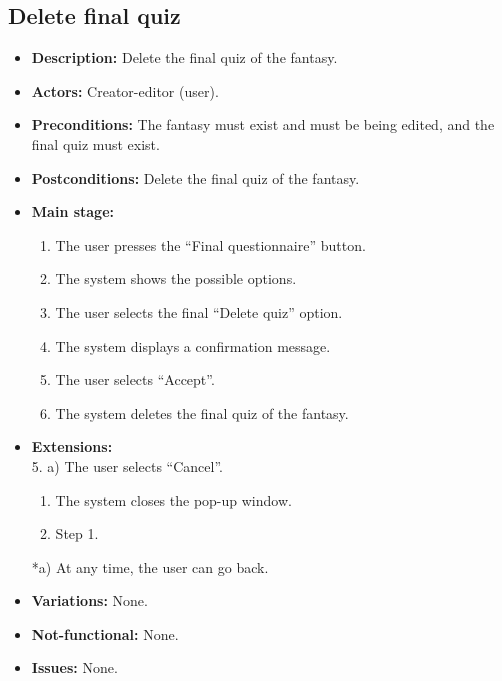 \subsection{Delete final quiz}
\begin{itemize}
	\item \textbf{Description:} Delete the final quiz of the fantasy.
	\item \textbf{Actors:} Creator-editor (user).
	\item \textbf{Preconditions:} The fantasy must exist and must be being edited, and the final quiz must exist.
	\item \textbf{Postconditions:} Delete the final quiz of the fantasy.
	\item \textbf{Main stage:}
	\begin{enumerate}
		\item The user presses the ``Final questionnaire'' button.
		\item The system shows the possible options.
		\item The user selects the final ``Delete quiz'' option.
		\item The system displays a confirmation message.
		\item The user selects ``Accept''.
		\item The system deletes the final quiz of the fantasy.
	\end{enumerate}
	\item \textbf{Extensions:} \\ 5. a) The user selects ``Cancel''.
	\begin{enumerate}
		\item The system closes the pop-up window.
		\item Step 1.
	\end{enumerate}
	*a) At any time, the user can go back.
	\item \textbf{Variations:} None.
	\item \textbf{Not-functional:} None.
	\item \textbf{Issues:} None.
\end{itemize}


